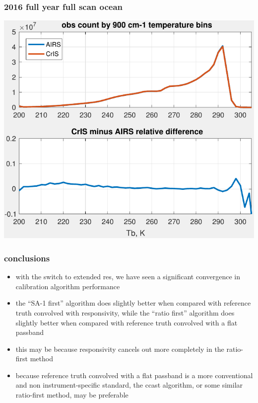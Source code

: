 \documentclass[11pt]{beamer}
\begin{document}
\begin{frame}
\frametitle{2016 full year full scan ocean}
\begin{center}
  \includegraphics[scale=0.7]{figures/full-scan_ocean_2016_all.pdf}
\end{center}
\end{frame} %
\begin{frame}
\frametitle{conclusions}

\begin{itemize}

  \item with the switch to extended res, we have seen a significant
    convergence in calibration algorithm performance 

  \item the {\noaa} ``SA-1 first'' algorithm does slightly better
    when compared with reference truth convolved with responsivity,
    while the {\ccast} ``ratio first'' algorithm does slightly
    better when compared with reference truth convolved with a flat
    passband

  \item this may be because responsivity cancels out more completely
    in the ratio-first method

  \item because reference truth convolved with a flat passband is a
    more conventional and non instrument-specific standard, the
    ccast algorithm, or some similar ratio-first method, may be
    preferable

\end{itemize}

\end{frame}
\end{document}
